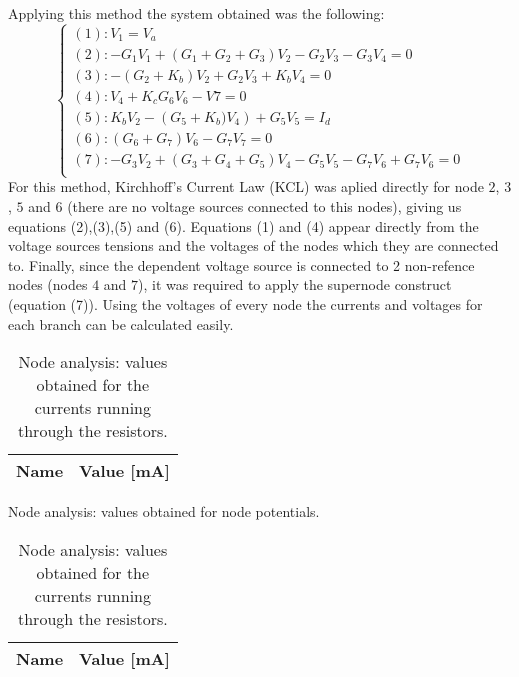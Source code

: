 Applying this method the system obtained was the following:
\begin{equation}
  \begin{cases}
    \left(1\right): V_{1}=V_{a}                                                                        \\
    \left(2\right): -G_{1}V_{1}+\left(G_{1}+G_{2}+G_{3}\right)V_{2}-G_{2}V_{3}-G_{3}V_{4}=0            \\
    \left(3\right): -\left(G_{2}+K_{b}\right)V_{2}+G_{2}V_{3}+K_{b}V_{4}=0                             \\
    \left(4\right): V_{4}+K_{c}G_{6}V_{6}-V{7}=0                                                       \\
    \left(5\right): K_{b}V_{2}-\left(G_{5}+K_{b})V_{4} \right) +G_{5}V_{5}=I_{d}                       \\
    \left(6\right): \left(G_{6}+G_{7}\right)V_{6}-G_{7}V_{7}=0                                         \\
    \left(7\right): -G_{3}V_{2}+\left(G_{3}+G_{4}+G_{5}\right)V_{4}-G_{5}V_{5}-G_{7}V_{6}+G_{7}V_{6}=0 \\
  \end{cases}
\end{equation}
For this method, Kirchhoff's Current Law (KCL) was aplied directly for node $2$, $3$, $5$ and $6$ (there are no voltage sources connected to this nodes), giving us equations (2),(3),(5) and (6). Equations (1) and (4) appear directly from the voltage sources tensions and the voltages of the nodes which they are connected to. Finally, since the dependent voltage source is connected to 2 non-refence nodes (nodes $4$ and $7$), it was required to apply the supernode construct (equation (7)).
Using the voltages of every node the currents and voltages for each branch can be calculated easily.


\begin{table}[h]
  \centering
  \begin{tabular}{|l|r|}
    \hline
    {\bf Name} & {\bf Value [mA]} \\ \hline
    
  \end{tabular}
  \caption{Node analysis: values obtained for node potentials.}
  \caption{Node analysis: values obtained for the currents running through the resistors.}
  \label{tab:op2}
\end{table}

\begin{table}[h]
  \centering
  \begin{tabular}{|l|r|}
    \hline
    {\bf Name} & {\bf Value [mA]} \\ \hline
    
  \end{tabular}
  \caption{Node analysis: values obtained for the currents running through the resistors.}
  \label{tab:op3}
\end{table}